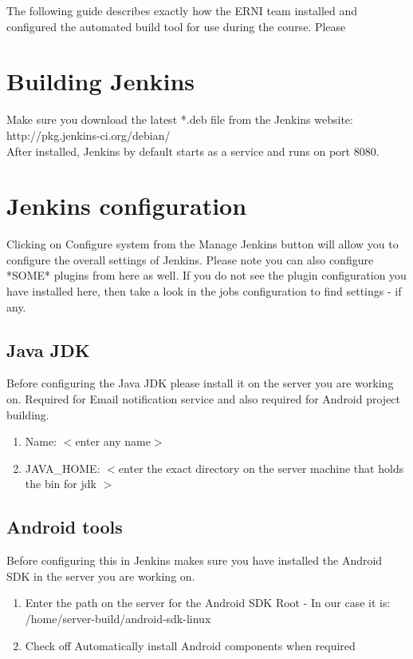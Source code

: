 The following guide describes exactly how the ERNI team installed and configured the automated build tool for use during the course. Please 

\section{Building Jenkins}
Make sure you download the latest *.deb file from the Jenkins website:\\

http://pkg.jenkins-ci.org/debian/\\

After installed, Jenkins by default starts as a service and runs on port 8080.\\

\section{Jenkins configuration}

Clicking on Configure system  from the Manage Jenkins button will allow you to configure the overall settings of Jenkins. Please note you can also configure *SOME* plugins from here as well. If you do not see the plugin configuration you have installed here, then take a look in the jobs configuration to find settings - if any. 

\subsection {Java JDK}

Before configuring the Java JDK please install it on the server you are working on.
Required for Email notification service and also required for Android project building.
\begin{enumerate}
\item Name: $<$enter any name$>$
\item JAVA\_HOME: $<$enter the exact directory on the server machine that holds the bin for jdk $>$ 
\end{enumerate}

\subsection {Android tools}

Before configuring this in Jenkins makes sure you have installed the Android SDK in the server you are working on. 

\begin{enumerate}
\item Enter the path on the server for the Android SDK Root - In our case it is: /home/server-build/android-sdk-linux
\item Check off Automatically install Android components when required
\end{enumerate}
